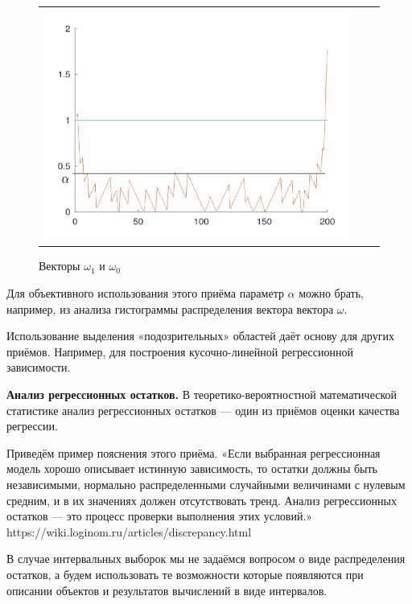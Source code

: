 \documentclass[a4paper,14pt]{article}
\begin{document}
	\begin{figure}[H]
		\begin{center}
			\begin{tabular}{ccc}
				\includegraphics[scale=0.8]{../image/problem4.png}
			\end{tabular}
		\end{center}
		\caption{Векторы $\omega_1$ и $\omega_0$} 
	\end{figure}

	Для объективного использования этого приёма параметр $\alpha$ можно
	брать, например, из анализа гистограммы распределения вектора вектора $\omega$.
	
	Использование выделения «подозрительных» областей даёт основу для других приёмов. Например, для построения кусочно-линейной регрессионной зависимости.
	
	\textbf{Анализ регрессионных остатков.} В теоретико-вероятностной математической статистике анализ регрессионных остатков — один из приёмов оценки качества регрессии.
	
	Приведём пример пояснения этого приёма. «Если выбранная регрессионная модель хорошо описывает истинную зависимость, то остатки должны быть независимыми, нормально распределенными случайными величинами с нулевым средним, и в
	их значениях должен отсутствовать тренд. Анализ регрессионных остатков — это процесс проверки выполнения этих условий.»
	https://wiki.loginom.ru/articles/discrepancy.html
	
	В случае интервальных выборок мы не задаёмся вопросом о виде
	распределения остатков, а будем использовать те возможности которые
	появляются при описании объектов и результатов вычислений в виде
	интервалов.
	
\end{document}
